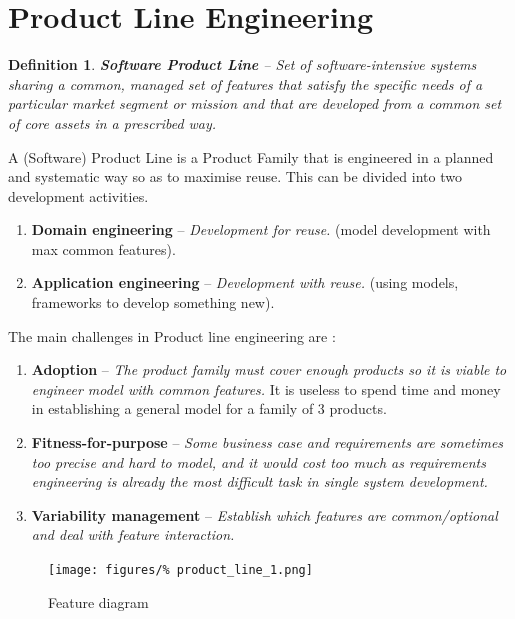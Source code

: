 \documentclass[a4paper,11pt]{report}
\newtheorem{definition}{Definition}
\begin{document}
\section{Product Line Engineering}
	\begin{definition}
		\textbf{Software Product Line} -- 
			Set of software-intensive systems sharing 
			a common, managed set of features that
			satisfy the specific needs of a particular
			market segment or
			mission and that are developed from a common
			set of core assets in a prescribed way.
	\end{definition}
	A (Software) Product Line is a Product Family that 
	is engineered in a planned and systematic way so as 
	to maximise reuse.
	This can be divided into two development activities.
	\begin{enumerate}
		\setlength{\itemsep}{0pt}		
		\setlength{\parskip}{0pt}		
		\setlength{\parsep}{0pt}	
		\item \textbf{Domain engineering} -- 
			\textit{Development for reuse.} (model
			development with max common features).
		\item \textbf{Application engineering} --
			\textit{Development with reuse.} (using 
			models, frameworks to develop something
			new).
	\end{enumerate}
	The main challenges in Product line engineering
	are :
	\begin{enumerate}
		\setlength{\itemsep}{0pt}		
		\setlength{\parskip}{0pt}		
		\setlength{\parsep}{0pt}	
		\item \textbf{Adoption} --
			\textit{The product family must cover enough
			products so it is viable to engineer
			model with common features.} It is useless
			to spend time and money in establishing 
			a general model for a family of 3 products.
		\item \textbf{Fitness-for-purpose} --
			\textit{Some business case and requirements
			are sometimes too precise and hard to model,
			and it would cost too much as requirements
			engineering is already the most difficult
			task in single system development.}
		\item \textbf{Variability management} --
			\textit{Establish which features are
			common/optional and deal with feature
			interaction.}
	\end{enumerate}
	\begin{figure}[H]
		\centering
		\texttt{[image: figures/\%
			product\_line\_1.png]}
		\caption{Feature diagram}
		\label{fig:feature_diagram:1}
	\end{figure}\noindent
\end{document}
